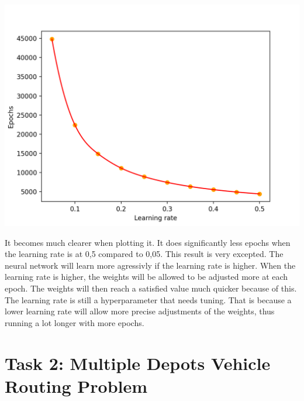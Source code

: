 \documentclass[titlepage, 11pt]{article}
\begin{document}
    \begin{center}
        \includegraphics[]{Task1.png}
    \end{center}
    It becomes much clearer when plotting it. It does significantly less epochs when the learning rate is at 0,5 compared to 0,05. This result is very excepted. The neural network will learn more agressivly if the learning rate is higher. When the learning rate is higher, the weights will be allowed to be adjusted more at each epoch. The weights will then reach a satisfied value much quicker because of this. The learning rate is still a hyperparameter that needs tuning. That is because a lower learning rate will allow more precise adjustments of the weights, thus running a lot longer with more epochs. 
    \section{Task 2: Multiple Depots Vehicle Routing Problem}
\end{document}
